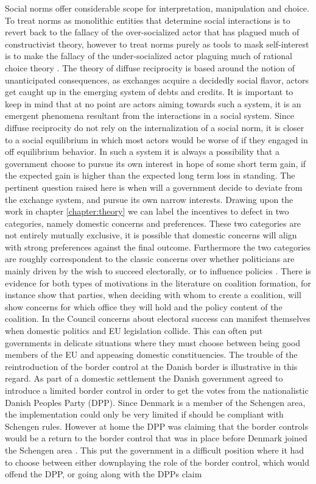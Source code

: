 Social norms offer considerable scope for interpretation, manipulation and choice. To treat norms as monolithic entities that determine social interactions is to revert back to the fallacy of the over-socialized actor that has plagued much of constructivist theory, however to treat norms purely as tools to mask self-interest is to make the fallacy of the under-socialized actor plaguing much of rational choice theory \citetext{see \citealt{Elster1989} and \citealt{Schimmelfennig2000} for good overviews and critiques}. The theory of diffuse reciprocity is based around the notion of unanticipated consequences, as exchanges acquire a decidedly social flavor, actors get caught up in the emerging system of debts and credits. It is important to keep in mind that at no point are actors aiming towards such a system, it is an emergent phenomena resultant from the interactions in a social system. Since diffuse reciprocity do not rely on the internalization of a social norm, it is closer to a social equilibrium in which most actors would be worse of if they engaged in off equilibrium behavior. In such a system it is always a possibility that a government choose to pursue its own interest in hope of some short term gain, if the expected gain is higher than the expected long term loss in standing. The pertinent question raised here is when will a government decide to deviate from the exchange system, and pursue its own narrow interests. Drawing upon the work in chapter \ref{chapter:theory} we can label the incentives to defect in two categories, namely domestic concerns and preferences. These two categories are not entirely mutually exclusive, it is possible that domestic concerns will align with strong preferences against the final outcome. Furthermore the two categories are roughly correspondent to the classic concerns over whether politicians are mainly driven by the wish to succeed electorally, or to influence policies \citep{Strom1990}. There is evidence for both types of motivations in the literature on coalition formation, for instance \citet{MartinStevenson2001} show that parties, when deciding with whom to create a coalition, will show concerns for which office they will hold and the policy content of the coalition. In the Council concerns about electoral success can manifest themselves when domestic politics and EU legislation collide. This can often put governments in delicate situations where they must choose between being good members of the EU and appeasing domestic constituencies. The trouble of the reintroduction of the border control at the Danish border is illustrative in this regard. As part of a domestic settlement the Danish government agreed to introduce a limited border control in order to get the votes from the nationalistic Danish Peoples Party (DPP). Since Denmark is a member of the Schengen area, the implementation could only be very limited if should be compliant with Schengen rules. However at home the DPP was claiming that the border controls would be a return to the border control that was in place before Denmark joined the Schengen area \citep{Olsen2011,Euractiv2011}. This put the government in a difficult position where it had to choose between either downplaying the role of the border control, which would offend the DPP, or going along with the DPPs claim 